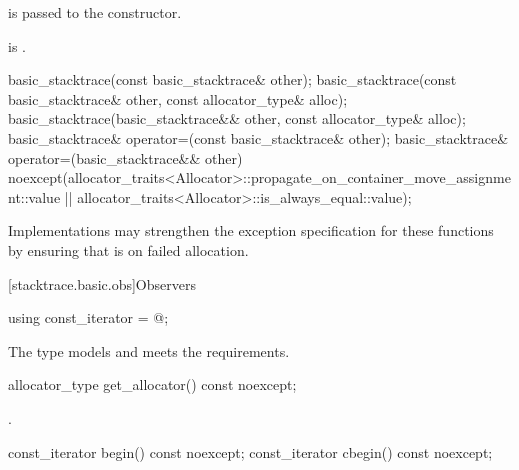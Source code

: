 \begin{itemdescr}
\pnum
\effects
{} is passed to the  constructor.

\pnum
\ensures
{} is .
\end{itemdescr}

%
%
\begin{itemdecl}
basic_stacktrace(const basic_stacktrace& other);
basic_stacktrace(const basic_stacktrace& other, const allocator_type& alloc);
basic_stacktrace(basic_stacktrace&& other, const allocator_type& alloc);
basic_stacktrace& operator=(const basic_stacktrace& other);
basic_stacktrace& operator=(basic_stacktrace&& other)
  noexcept(allocator_traits<Allocator>::propagate_on_container_move_assignment::value ||
    allocator_traits<Allocator>::is_always_equal::value);
\end{itemdecl}

\begin{itemdescr}
\pnum
\remarks
Implementations may strengthen the exception specification
for these functions
by ensuring that  is  on failed allocation.
\end{itemdescr}

[stacktrace.basic.obs]{Observers}

%
\begin{itemdecl}
using const_iterator = @\impdef@;
\end{itemdecl}

\begin{itemdescr}
\pnum
The type models
 and
meets the
 requirements.
\end{itemdescr}

%
\begin{itemdecl}
allocator_type get_allocator() const noexcept;
\end{itemdecl}

\begin{itemdescr}
\pnum
\returns
{}.
\end{itemdescr}

%
%
\begin{itemdecl}
const_iterator begin() const noexcept;
const_iterator cbegin() const noexcept;
\end{itemdecl}

